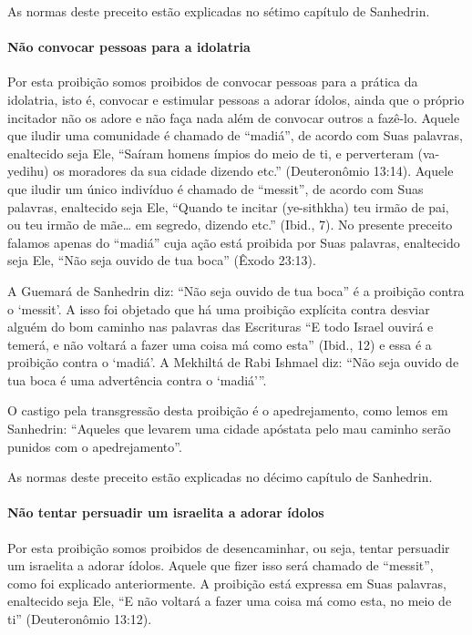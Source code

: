 As normas deste preceito estão explicadas no sétimo capítulo de Sanhedrin.

\paragraph{Não convocar pessoas para a idolatria}

Por esta proibição somos proibidos de convocar pessoas para a prática
da idolatria, isto é, convocar e estimular pessoas a adorar ídolos,
ainda que o próprio incitador não os adore e não faça nada além de
convocar outros a fazê-lo. Aquele que iludir uma comunidade é chamado de
``madiá'', de acordo com Suas palavras, enaltecido seja Ele, ``Saíram
homens ímpios do meio de ti, e perverteram (va-yedihu) os moradores da
sua cidade dizendo etc.'' (Deuteronômio 13:14). Aquele que iludir um
único indivíduo é chamado de ``messit'', de acordo com Suas palavras,
enaltecido seja Ele, ``Quando te incitar (ye-sithkha) teu irmão de pai,
ou teu irmão de mãe\ldots{} em segredo, dizendo etc.'' (Ibid., 7). No
presente preceito falamos apenas do ``madiá'' cuja ação está proibida
por Suas palavras, enaltecido seja Ele, ``Não seja ouvido de tua boca''
(Êxodo 23:13).

A Guemará de Sanhedrin diz: ``Não seja ouvido de tua boca'' é a
proibição contra o `messit'. A isso foi objetado que há uma proibição
explícita contra desviar alguém do bom caminho nas palavras das
Escrituras ``E todo Israel ouvirá e temerá, e não voltará a fazer uma
coisa má como esta'' (Ibid., 12) e essa é a proibição contra o `madiá'.
A Mekhiltá de Rabi Ishmael diz: ``Não seja ouvido de tua boca é uma
advertência contra o `madiá'''.

O castigo pela transgressão desta proibição é o apedrejamento, como
lemos em Sanhedrin: ``Aqueles que levarem uma cidade apóstata pelo mau
caminho serão punidos com o apedrejamento''.

As normas deste preceito estão explicadas no décimo capítulo de Sanhedrin.

\paragraph{Não tentar persuadir um israelita a adorar ídolos}

Por esta proibição somos proibidos de desencaminhar, ou seja, tentar
persuadir um israelita a adorar ídolos. Aquele que fizer isso será
chamado de ``messit'', como foi explicado anteriormente. A proibição
está expressa em Suas palavras, enaltecido seja Ele, ``E não voltará a
fazer uma coisa má como esta, no meio de ti'' (Deuteronômio 13:12).

